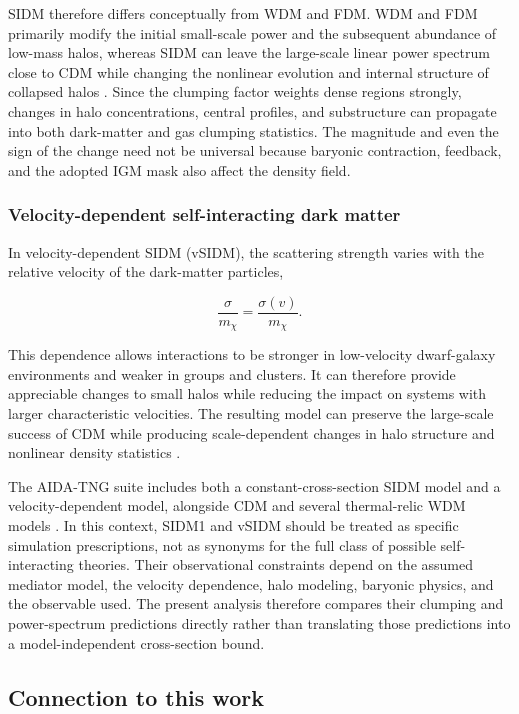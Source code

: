 \documentclass[%
 reprint,
nofootinbib,
 amsmath,amssymb,
 aps,
]{revtex4-2}
\begin{document}
SIDM therefore differs conceptually from WDM and FDM. WDM and FDM primarily modify the initial small-scale power and the subsequent abundance of low-mass halos, whereas SIDM can leave the large-scale linear power spectrum close to CDM while changing the nonlinear evolution and internal structure of collapsed halos \cite{marsh2021ultralight,tulin2018sidm}. Since the clumping factor weights dense regions strongly, changes in halo concentrations, central profiles, and substructure can propagate into both dark-matter and gas clumping statistics. The magnitude and even the sign of the change need not be universal because baryonic contraction, feedback, and the adopted IGM mask also affect the density field.

\subsubsection{Velocity-dependent self-interacting dark matter}

In velocity-dependent SIDM (vSIDM), the scattering strength varies with the relative velocity of the dark-matter particles,

\begin{equation}
\frac{\sigma}{m_\chi}=\frac{\sigma(v)}{m_\chi}.
\end{equation}

This dependence allows interactions to be stronger in low-velocity dwarf-galaxy environments and weaker in groups and clusters. It can therefore provide appreciable changes to small halos while reducing the impact on systems with larger characteristic velocities. The resulting model can preserve the large-scale success of CDM while producing scale-dependent changes in halo structure and nonlinear density statistics \cite{tulin2018sidm}.

The AIDA-TNG suite includes both a constant-cross-section SIDM model and a velocity-dependent model, alongside CDM and several thermal-relic WDM models \cite{despali2025aidatng}. In this context, SIDM1 and vSIDM should be treated as specific simulation prescriptions, not as synonyms for the full class of possible self-interacting theories. Their observational constraints depend on the assumed mediator model, the velocity dependence, halo modeling, baryonic physics, and the observable used. The present analysis therefore compares their clumping and power-spectrum predictions directly rather than translating those predictions into a model-independent cross-section bound.

\subsection{Connection to this work}
\end{document}
